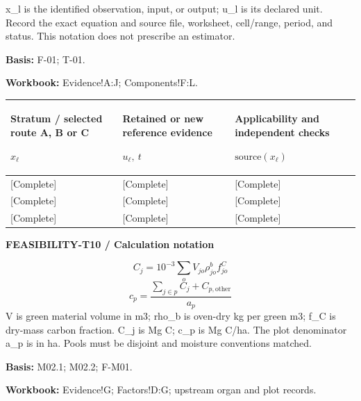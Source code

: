 x\_l is the identified observation, input, or output; u\_l is its declared unit. Record the exact equation and source file, worksheet, cell/range, period, and status. This notation does not prescribe an estimator.\par
\textbf{Basis:} F-01; T-01.\par
\textbf{Workbook:} Evidence!A:J; Components!F:L.\par\endgroup
{\sffamily\fontsize{8.3}{10.3}\selectfont\begin{longtable}{@{}P{51.14mm} P{59.39mm} P{54.44mm}@{}}
\toprule
\textbf{Stratum / selected route A, B or C}\par {\normalfont\fontsize{8.2}{10}\selectfont $x_{\ell}$} & \textbf{Retained or new reference evidence}\par {\normalfont\fontsize{8.2}{10}\selectfont $u_{\ell},\ t$} & \textbf{Applicability and independent checks}\par {\normalfont\fontsize{8.2}{10}\selectfont $\text{source}(x_{\ell})$}\\\midrule\endhead
\rule{0pt}{7.7mm}[Complete] & [Complete] & [Complete]\\\hline
\rule{0pt}{7.7mm}[Complete] & [Complete] & [Complete]\\\hline
\rule{0pt}{7.7mm}[Complete] & [Complete] & [Complete]\\\hline
\end{longtable}}
\par\begingroup\sffamily\fontsize{8}{10}\selectfont\color{NEBGreen}\setlength{\parskip}{2pt}\setlength{\abovedisplayskip}{4pt}\setlength{\belowdisplayskip}{4pt}\setlength{\abovedisplayshortskip}{2pt}\setlength{\belowdisplayshortskip}{3pt}
\textbf{FEASIBILITY-T10 / Calculation notation}\par
{\fontsize{9}{11}\selectfont\[ C_j=10^{-3}\sum_o V_{jo}\rho^b_{jo}f^C_{jo} \]}
{\fontsize{9}{11}\selectfont\[ c_p=\frac{\sum_{j\in p}C_j+C_{p,\mathrm{other}}}{a_p} \]}
V is green material volume in m3; rho\_b is oven-dry kg per green m3; f\_C is dry-mass carbon fraction. C\_j is Mg C; c\_p is Mg C/ha. The plot denominator a\_p is in ha. Pools must be disjoint and moisture conventions matched.\par
\textbf{Basis:} M02.1; M02.2; F-M01.\par
\textbf{Workbook:} Evidence!G; Factors!D:G; upstream organ and plot records.\par\endgroup
